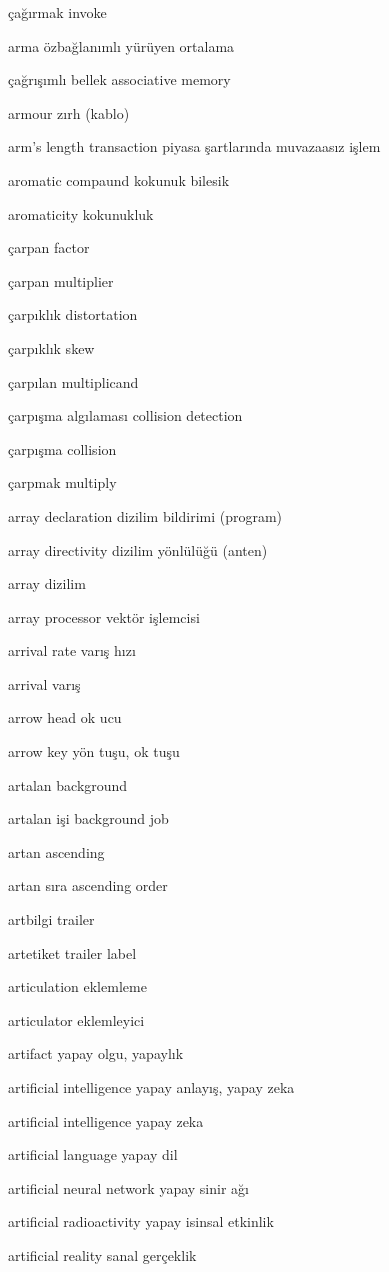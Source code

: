 \documentclass[12pt,fleqn]{article}\usepackage{../../common}
\begin{document}
çağırmak invoke

arma özbağlanımlı yürüyen ortalama

çağrışımlı bellek associative memory

armour zırh (kablo)

arm's length transaction piyasa şartlarında muvazaasız işlem

aromatic compaund kokunuk bilesik

aromaticity kokunukluk

çarpan factor

çarpan multiplier

çarpıklık distortation

çarpıklık skew

çarpılan multiplicand

çarpışma algılaması collision detection

çarpışma collision

çarpmak multiply

array declaration dizilim bildirimi (program)

array directivity dizilim yönlülüğü (anten)

array dizilim

array processor vektör işlemcisi

arrival rate varış hızı

arrival varış

arrow head ok ucu

arrow key yön tuşu, ok tuşu

artalan background

artalan işi background job

artan ascending

artan sıra ascending order

artbilgi trailer

artetiket trailer label

articulation eklemleme

articulator eklemleyici

artifact yapay olgu, yapaylık

artificial intelligence yapay anlayış, yapay zeka

artificial intelligence yapay zeka

artificial language yapay dil

artificial neural network yapay sinir ağı

artificial radioactivity yapay isinsal etkinlik

artificial reality sanal gerçeklik
\end{document}
